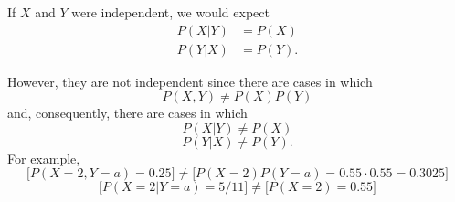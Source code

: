 If $X$ and $Y$ were independent, we would expect
\begin{align*}
    P(X|Y) &= P(X) \\
    P(Y|X) &= P(Y).    
\end{align*}

However, they are not independent since there are cases in which
\[
P(X,Y) \neq P(X)P(Y)
\]
and, consequently, there are cases in which
\[
P(X|Y) \neq P(X)
\]
\[
P(Y|X) \neq P(Y).
\]
For example,
\[
\big[P(X=2,Y=a)=0.25\big] \neq \big[P(X=2)P(Y=a)=0.55\cdot 0.55 = 0.3025\big]
\]
\[
\big[P(X=2|Y=a)=5/11\big]\neq \big[P(X=2)=0.55\big]
\]